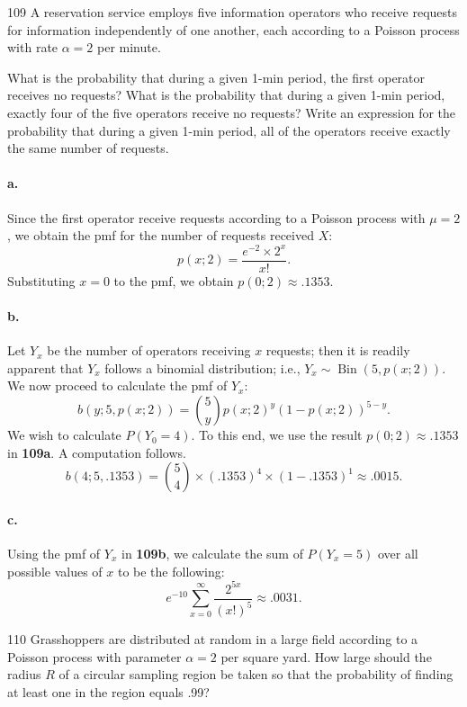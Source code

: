 \documentclass{exam}
\DeclareMathOperator{\Bin}{Bin}
\begin{document}
\begin{problem}{109}
	A reservation service employs five information operators who receive requests for information independently of one another, each according to a Poisson process with rate $\alpha = 2$ per minute.
	\begin{tasks}[label=\textbf{\alph*.}]
		\task What is the probability that during a given 1-min period, the first operator receives no requests?
		\task What is the probability that during a given 1-min period, exactly four of the five operators receive no requests?
		\task Write an expression for the probability that during a given 1-min period, all of the operators receive exactly the same number of requests.
	\end{tasks}
\end{problem}

\paragraph{a.} Since the first operator receive requests according to a Poisson process with $\mu = 2$, we obtain the pmf for the number of requests received $X$:
\[
	p(x; 2) = \frac{e^{-2}\times 2^x}{x!}.
\]
Substituting $x = 0$ to the pmf, we obtain $p(0; 2) \approx .1353$.

\paragraph{b.} Let $Y_x$ be the number of operators receiving $x$ requests; then it is readily apparent that $Y_x$ follows a binomial distribution; i.e., $Y_x \sim \Bin(5, p(x; 2))$. We now proceed to calculate the pmf of $Y_x$:
\[
	b(y; 5, p(x; 2)) = \binom{5}{y} p(x; 2)^y (1 - p(x; 2))^{5 - y}.
\]
We wish to calculate $P(Y_0 = 4)$. To this end, we use the result $p(0; 2) \approx .1353$ in \textbf{109a}. A computation follows.
\[
	b(4; 5, .1353) = \binom54 \times (.1353)^4 \times (1 - .1353)^1 \approx .0015.
\]

\paragraph{c.} Using the pmf of $Y_x$ in \textbf{109b}, we calculate the sum of $P(Y_x = 5)$ over all possible values of $x$ to be the following:
\[
	e^{-10}\sum_{x = 0}^\infty\frac{2^{5x}}{(x!)^5} \approx .0031.
\]

\begin{problem}{110}
	Grasshoppers are distributed at random in a large field according to a Poisson process with parameter $\alpha = 2$ per square yard. How large should the radius $R$ of a circular sampling region be taken so that the probability of finding at least one in the region equals .99?
\end{problem}
\end{document}
